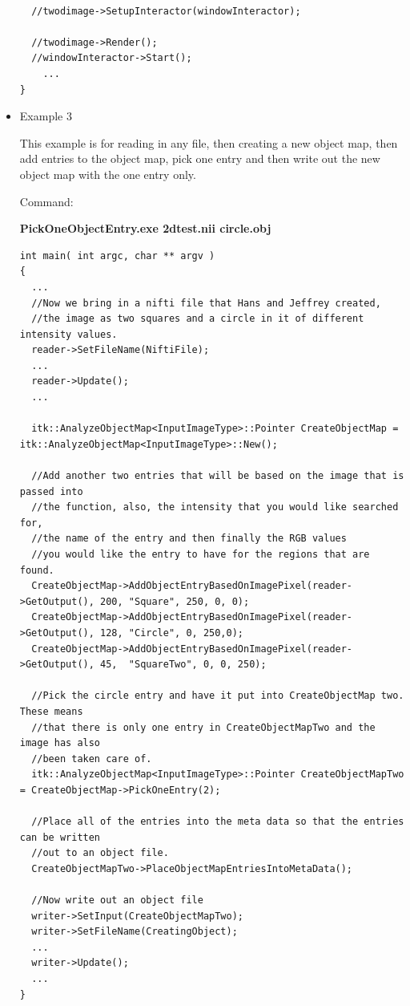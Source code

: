 \documentclass{InsightArticle}
\begin{document}
\begin{itemize}
\begin{verbatim}
  
  //twodimage->SetupInteractor(windowInteractor);
  
  //twodimage->Render();
  //windowInteractor->Start();
	...
}
\end{verbatim} \normalsize
                                                                               
\item Example 3

This example is for reading in any file, then creating a new object map, then add entries to the object map, pick one entry and then write out the new object map with the one entry only.

Command:

\textbf{PickOneObjectEntry.exe 2dtest.nii circle.obj}

\small \begin{verbatim}
int main( int argc, char ** argv )
{
  ...
  //Now we bring in a nifti file that Hans and Jeffrey created, 
  //the image as two squares and a circle in it of different intensity values.
  reader->SetFileName(NiftiFile);
  ...
  reader->Update();
  ...
  
  itk::AnalyzeObjectMap<InputImageType>::Pointer CreateObjectMap = itk::AnalyzeObjectMap<InputImageType>::New();
  
  //Add another two entries that will be based on the image that is passed into 
  //the function, also, the intensity that you would like searched for, 
  //the name of the entry and then finally the RGB values
  //you would like the entry to have for the regions that are found.
  CreateObjectMap->AddObjectEntryBasedOnImagePixel(reader->GetOutput(), 200, "Square", 250, 0, 0);
  CreateObjectMap->AddObjectEntryBasedOnImagePixel(reader->GetOutput(), 128, "Circle", 0, 250,0);
  CreateObjectMap->AddObjectEntryBasedOnImagePixel(reader->GetOutput(), 45,  "SquareTwo", 0, 0, 250);
  
  //Pick the circle entry and have it put into CreateObjectMap two.  These means
  //that there is only one entry in CreateObjectMapTwo and the image has also
  //been taken care of.
  itk::AnalyzeObjectMap<InputImageType>::Pointer CreateObjectMapTwo = CreateObjectMap->PickOneEntry(2);
  
  //Place all of the entries into the meta data so that the entries can be written
  //out to an object file.
  CreateObjectMapTwo->PlaceObjectMapEntriesIntoMetaData();
  
  //Now write out an object file
  writer->SetInput(CreateObjectMapTwo);
  writer->SetFileName(CreatingObject);
  ...
  writer->Update();
  ...
}
\end{verbatim} \normalsize


\end{itemize}
\end{document}
